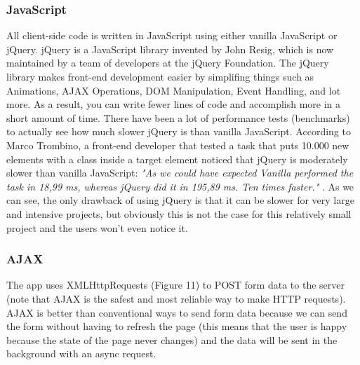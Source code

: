 \documentclass[12pt]{article} %
\begin{document}
  \subsubsection{JavaScript \cite{javascript}} All client-side code is written in JavaScript using either vanilla JavaScript or jQuery.
	jQuery is a JavaScript library invented by John Resig, which is now maintained by a team of developers at the jQuery Foundation.
	The jQuery library makes front-end development easier by simplifing things such as Animations, AJAX Operations, DOM Manipulation, 
	Event Handling, and lot more. As a result, you can write fewer lines of code and accomplish more in a short amount of time.
	There have been a lot of performance tests (benchmarks) to actually see how much slower jQuery is than vanilla JavaScript. According to Marco Trombino, a front-end developer
	that tested a task that puts 10.000 new elements with a class inside a target element noticed that jQuery is moderately slower than vanilla JavaScript: 
	\textit{"As we could have expected Vanilla performed the task in 18,99 ms, whereas jQuery did it in 195,89 ms. Ten times faster."} \cite{jQuery}.
	As we can see, the only drawback of using jQuery is that it can be slower for very large and intensive projects, but obviously this is not the case for this relatively
	small project and the users won't even notice it. 

   \subsubsection{AJAX  \cite{ajax}} The app uses XMLHttpRequests (Figure 11) to POST form data to the server \cite{ajaxForms} (note that AJAX is the safest and most reliable way to make HTTP requests).
	AJAX is better than conventional ways to send form data because we can send the form without having to refresh the page (this means that the user is happy because the state
	of the page never changes) and the data will be sent in the background with an async request.
\end{document}
